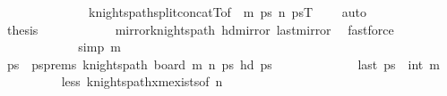 \begin{isabellebody}
\ \ \ \ \ \ \ \ \ \ \ \ \ \ knights{\isacharunderscore}{\kern0pt}path{\isacharunderscore}{\kern0pt}split{\isacharunderscore}{\kern0pt}concatT{\isacharbrackleft}{\kern0pt}of\ {}\ m\ {\isacharquery}{\kern0pt}ps\ {\isachardoublequoteopen}n{\isacharminus}{\kern0pt}{}{\isachardoublequoteclose}\ {\isacharquery}{\kern0pt}psT\ {\isachardoublequoteopen}{\isacharparenleft}{\kern0pt}{}{\isacharcomma}{\kern0pt}{}{\isacharparenright}{\kern0pt}{\isachardoublequoteclose}\ {\isachardoublequoteopen}{\isacharparenleft}{\kern0pt}{}{\isacharcomma}{\kern0pt}{}{\isacharparenright}{\kern0pt}{\isachardoublequoteclose}{\isacharbrackright}{\kern0pt}\ \isamarkupfalse%
\ auto\isanewline
\ \ \ \ \ \ \ \ \isamarkupfalse%
\ \isamarkupfalse%
\ {\isacharquery}{\kern0pt}thesis\isanewline
\ \ \ \ \ \ \ \ \ \ \isamarkupfalse%
\ mirror{}{\isacharunderscore}{\kern0pt}knights{\isacharunderscore}{\kern0pt}path\ hd{\isacharunderscore}{\kern0pt}mirror{}\ last{\isacharunderscore}{\kern0pt}mirror{}\ \isamarkupfalse%
\ fastforce\isanewline
\ \ \ \ \ \ \isamarkupfalse%
\isanewline
\ \ \ \ \isamarkupfalse%
\isanewline
\ \ \ \ \ \ \isamarkupfalse%
\ {\isacharbrackleft}{\kern0pt}simp{\isacharbrackright}{\kern0pt}{\isacharcolon}{\kern0pt}\ {\isachardoublequoteopen}m\ {\isacharequal}{\kern0pt}\ {}{\isachardoublequoteclose}\isanewline
\ \ \ \ \ \ \isamarkupfalse%
\ \isamarkupfalse%
\ ps\ \ ps{\isacharunderscore}{\kern0pt}prems{\isacharcolon}{\kern0pt}\ {\isachardoublequoteopen}knights{\isacharunderscore}{\kern0pt}path\ {\isacharparenleft}{\kern0pt}board\ m\ n{\isacharparenright}{\kern0pt}\ ps{\isachardoublequoteclose}\ {\isachardoublequoteopen}hd\ ps\ {\isacharequal}{\kern0pt}\ {\isacharparenleft}{\kern0pt}{}{\isacharcomma}{\kern0pt}{}{\isacharparenright}{\kern0pt}{\isachardoublequoteclose}\ \isanewline
\ \ \ \ \ \ \ \ \ \ {\isachardoublequoteopen}last\ ps\ {\isacharequal}{\kern0pt}\ {\isacharparenleft}{\kern0pt}int\ m{\isacharminus}{\kern0pt}{}{\isacharcomma}{\kern0pt}{}{\isacharparenright}{\kern0pt}{\isachardoublequoteclose}\isanewline
\ \ \ \ \ \ \ \ \isamarkupfalse%
\ less\ knights{\isacharunderscore}{\kern0pt}path{\isacharunderscore}{\kern0pt}{}xm{\isacharunderscore}{\kern0pt}exists{\isacharbrackleft}{\kern0pt}of\ n{\isacharbrackright}{\kern0pt}\ \isamarkupfalse%

\end{isabellebody}
